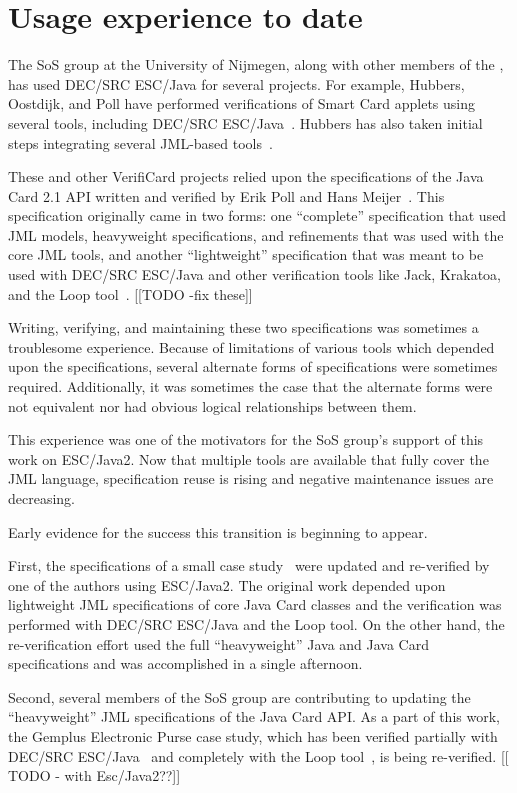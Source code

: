 \documentclass{acm_proc_article-sp}
\begin{document}
\section{Usage experience to date}
The SoS group at the University of Nijmegen, along with other members
of the , has used DEC/SRC ESC/Java for several projects.  For
example, Hubbers, Oostdijk, and Poll have performed verifications of
Smart Card applets using several tools, including DEC/SRC
ESC/Java~\cite{HOP04}.  Hubbers has also taken initial steps
integrating several JML-based tools~\cite{Hub03}.

These and other VerifiCard projects relied upon the specifications of
the Java Card 2.1 API written and verified by Erik Poll and Hans
Meijer~\cite{MeijerPoll01}.  This specification originally came in two
forms: one ``complete'' specification that used JML models,
heavyweight specifications, and refinements that was used with the
core JML tools, and another ``lightweight'' specification that was
meant to be used with DEC/SRC ESC/Java and other verification tools
like Jack, Krakatoa, and the Loop tool~\cite{a,b,c}.  [[TODO -fix these]]

Writing, verifying, and maintaining these two specifications was
sometimes a troublesome experience.  Because of limitations of various
tools which depended upon the specifications, several alternate forms
of specifications were sometimes required.  Additionally, it was
sometimes the case that the alternate forms were not equivalent nor
had obvious logical relationships between them.

This experience was one of the motivators for the SoS group's support
of this work on ESC/Java2.  Now that multiple tools are available that
fully cover the JML language, specification reuse is rising and
negative maintenance issues are decreasing.  

Early evidence for the success this transition is beginning to appear.

First, the specifications of a small case
study~\cite{BreunesseJacobsBerg02} were updated and re-verified by one
of the authors using ESC/Java2.  The original work depended upon
lightweight JML specifications of core Java Card classes and the
verification was performed with DEC/SRC ESC/Java and the Loop tool.
On the other hand, the re-verification effort used the full
``heavyweight'' Java and Java Card specifications and was accomplished
in a single afternoon.

Second, several members of the SoS group are contributing to updating
the ``heavyweight'' JML specifications of the Java Card API.  As a
part of this work, the Gemplus Electronic Purse case study, which has
been verified partially with DEC/SRC ESC/Java~\cite{CatanoHuisman02}
and completely with the Loop tool~\cite{JoachimsThesis?}, is being
re-verified. [[ TODO - with Esc/Java2??]]
\end{document}
